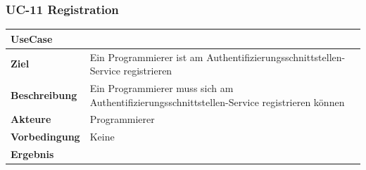 \newpage

\subsubsection{UC-11 Registration}\label{uc-11-registration}

\begin{longtable}[c]{@{}ll@{}}
\toprule
\begin{minipage}[b]{0.34\columnwidth}\raggedright\strut
\textbf{UseCase}
\strut\end{minipage} &
\begin{minipage}[b]{0.60\columnwidth}\raggedright\strut
\strut\end{minipage}\tabularnewline
\midrule
\endhead
\begin{minipage}[t]{0.34\columnwidth}\raggedright\strut
\textbf{Ziel}
\strut\end{minipage} &
\begin{minipage}[t]{0.60\columnwidth}\raggedright\strut
Ein Programmierer ist am Authentifizierungsschnittstellen-Service
registrieren
\strut\end{minipage}\tabularnewline
\begin{minipage}[t]{0.34\columnwidth}\raggedright\strut
\textbf{Beschreibung}
\strut\end{minipage} &
\begin{minipage}[t]{0.60\columnwidth}\raggedright\strut
Ein Programmierer muss sich am Authentifizierungsschnittstellen-Service
registrieren können
\strut\end{minipage}\tabularnewline
\begin{minipage}[t]{0.34\columnwidth}\raggedright\strut
\textbf{Akteure}
\strut\end{minipage} &
\begin{minipage}[t]{0.60\columnwidth}\raggedright\strut
Programmierer
\strut\end{minipage}\tabularnewline
\begin{minipage}[t]{0.34\columnwidth}\raggedright\strut
\textbf{Vorbedingung}
\strut\end{minipage} &
\begin{minipage}[t]{0.60\columnwidth}\raggedright\strut
Keine
\strut\end{minipage}\tabularnewline
\begin{minipage}[t]{0.34\columnwidth}\raggedright\strut
\textbf{Ergebnis}
\strut\end{minipage} &
\begin{minipage}[t]{0.60\columnwidth}\raggedright\strut

\end{minipage}
\end{longtable}
